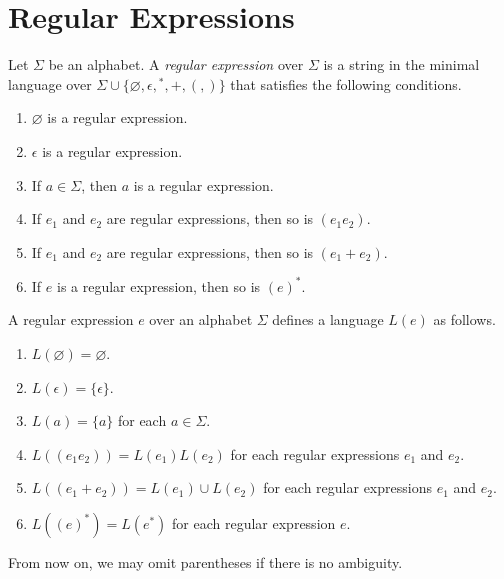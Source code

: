 \section{Regular Expressions}
\begin{definition}
  Let $\Sigma$ be an alphabet.
  A \emph{regular expression} over $\Sigma$ is a string in the minimal language
  over $\Sigma \cup \{\varnothing, \epsilon, {}^*, +, (, )\}$
  that satisfies the following conditions.
  \begin{enumerate}[1.]
    \item $\varnothing$ is a regular expression.
    \item $\epsilon$ is a regular expression.
    \item If $a \in \Sigma$, then $a$ is a regular expression.
    \item If $e_1$ and $e_2$ are regular expressions, then so is $(e_1e_2)$.
    \item If $e_1$ and $e_2$ are regular expressions, then so is
    $(e_1 + e_2)$.
    \item If $e$ is a regular expression, then so is $(e)^*$.
  \end{enumerate}
\end{definition}

\begin{definition}
  A regular expression $e$ over an alphabet $\Sigma$ defines a language $L(e)$
  as follows.
  \begin{enumerate}[1.]
    \item $L(\varnothing) = \varnothing$.
    \item $L(\epsilon) = \{\epsilon\}$.
    \item $L(a) = \{a\}$ for each $a \in \Sigma$.
    \item $L((e_1e_2)) = L(e_1)L(e_2)$ for each regular expressions $e_1$ and
    $e_2$.
    \item $L((e_1 + e_2)) = L(e_1) \cup L(e_2)$ for each regular
    expressions $e_1$ and $e_2$.
    \item $L((e)^*) = L(e^*)$ for each regular expression $e$.
  \end{enumerate}
\end{definition}

\begin{remark}
  From now on, we may omit parentheses if there is no ambiguity.
\end{remark}

